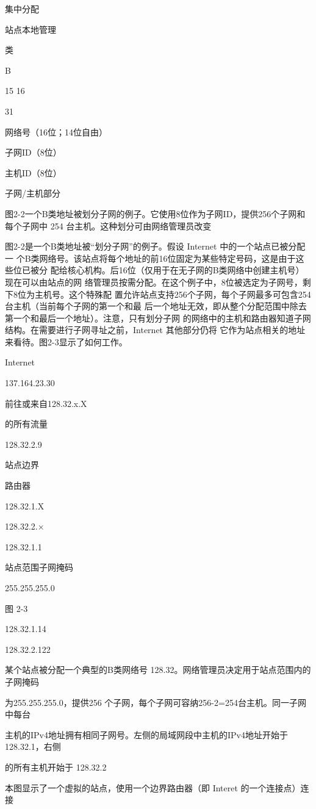 集中分配

站点本地管理

类

B

15 16

31

网络号（16位；14位自由）

子网ID（8位）

主机ID（8位）

子网/主机部分

图2-2一个B类地址被划分子网的例子。它使用8位作为子网ID，提供256个子网和每个子网中
254 台主机。这种划分可由网络管理员改变

图2-2是一个B类地址被“划分子网”的例子。假设 Internet 中的一个站点已被分配一
个B类网络号。该站点将每个地址的前16位固定为某些特定号码，这是由于这些位已被分
配给核心机构。后16位（仅用于在无子网的B类网络中创建主机号）现在可以由站点的网
络管理员按需分配。在这个例子中，8位被选定为子网号，剩下8位为主机号。这个特殊配
置允许站点支持256个子网，每个子网最多可包含254台主机（当前每个子网的第一个和最
后一个地址无效，即从整个分配范围中除去第一个和最后一个地址）。注意，只有划分子网
的网络中的主机和路由器知道子网结构。在需要进行子网寻址之前，Internet 其他部分仍将
它作为站点相关的地址来看待。图2-3显示了如何工作。

Internet

137.164.23.30

前往或来自128.32.x.X

的所有流量

128.32.2.9

站点边界

路由器

128.32.1.X

128.32.2.×

128.32.1.1

站点范围子网掩码

255.255.255.0

图 2-3

128.32.1.14

128.32.2.122

某个站点被分配一个典型的B类网络号 128.32。网络管理员决定用于站点范围内的子网掩码

为255.255.255.0，提供256 个子网，每个子网可容纳256-2=254台主机。同一子网中每台

主机的IPv4地址拥有相同子网号。左侧的局域网段中主机的IPv4地址开始于 128.32.1，右侧

的所有主机开始于 128.32.2

本图显示了一个虚拟的站点，使用一个边界路由器（即 Interet 的一个连接点）连接

